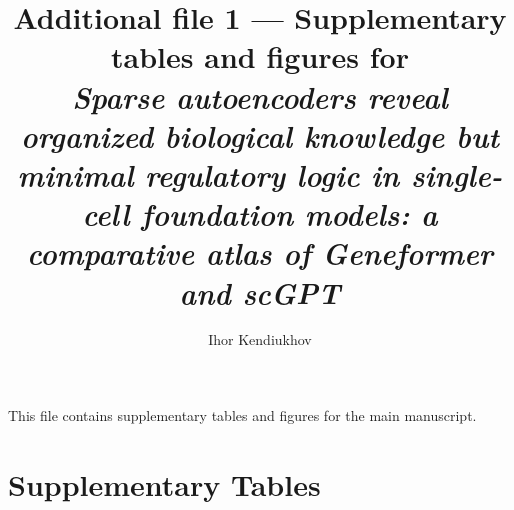 \documentclass[onecolumn]{article}
\title{\textbf{Additional file 1 --- Supplementary tables and figures for}\\[6pt]
\textit{Sparse autoencoders reveal organized biological knowledge but minimal regulatory logic in single-cell foundation models: a comparative atlas of Geneformer and scGPT}}
\author{Ihor Kendiukhov}
\date{}
\begin{document}
\maketitle

This file contains supplementary tables and figures for the main manuscript.

\tableofcontents

\clearpage


\section{Supplementary Tables}

\end{document}
